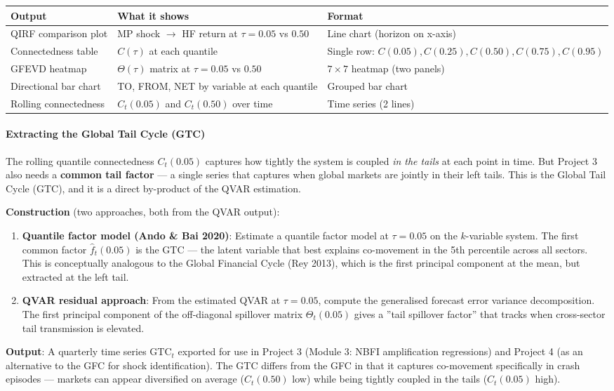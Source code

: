 \documentclass[11pt,a4paper]{article}
\begin{document}
{\small
\begin{longtable}{|p{}|p{}|p{}|}
\hline
\textbf{Output} & \textbf{What it shows} & \textbf{Format} \\
\hline
\endhead
QIRF comparison plot & MP shock $\rightarrow$ HF return at $\tau = 0.05$ vs $0.50$ & Line chart (horizon on x-axis) \\
\hline
Connectedness table & $C(\tau)$ at each quantile & Single row: $C(0.05), C(0.25), C(0.50), C(0.75), C(0.95)$ \\
\hline
GFEVD heatmap & $\Theta(\tau)$ matrix at $\tau = 0.05$ vs $0.50$ & $7 \times 7$ heatmap (two panels) \\
\hline
Directional bar chart & TO, FROM, NET by variable at each quantile & Grouped bar chart \\
\hline
Rolling connectedness & $C_t(0.05)$ and $C_t(0.50)$ over time & Time series (2 lines) \\
\hline
\end{longtable}
}


\paragraph{Extracting the Global Tail Cycle (GTC)}

The rolling quantile connectedness $C_t(0.05)$ captures how tightly the system is coupled \textit{in the tails} at each point in time. But Project 3 also needs a \textbf{common tail factor} --- a single series that captures when global markets are jointly in their left tails. This is the Global Tail Cycle (GTC), and it is a direct by-product of the QVAR estimation.

\textbf{Construction} (two approaches, both from the QVAR output):

\begin{enumerate}
\item \textbf{Quantile factor model (Ando \& Bai 2020)}: Estimate a quantile factor model at $\tau = 0.05$ on the $k$-variable system. The first common factor $\hat{f}_t(0.05)$ is the GTC --- the latent variable that best explains co-movement in the 5th percentile across all sectors. This is conceptually analogous to the Global Financial Cycle (Rey 2013), which is the first principal component at the mean, but extracted at the left tail.
\item \textbf{QVAR residual approach}: From the estimated QVAR at $\tau = 0.05$, compute the generalised forecast error variance decomposition. The first principal component of the off-diagonal spillover matrix $\Theta_t(0.05)$ gives a ''tail spillover factor'' that tracks when cross-sector tail transmission is elevated.

\end{enumerate}
\textbf{Output}: A quarterly time series $\text{GTC}_t$ exported for use in Project 3 (Module 3: NBFI amplification regressions) and Project 4 (as an alternative to the GFC for shock identification). The GTC differs from the GFC in that it captures co-movement specifically in crash episodes --- markets can appear diversified on average ($C_t(0.50)$ low) while being tightly coupled in the tails ($C_t(0.05)$ high).
\end{document}
